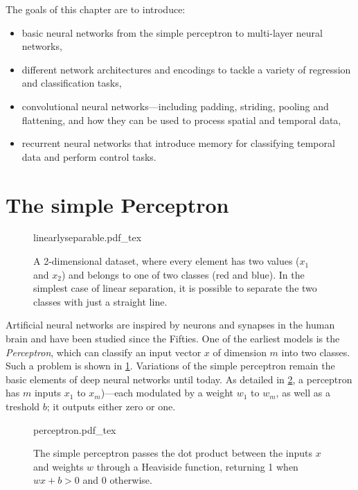 The goals of this chapter are to introduce:

\begin{itemize}
    \item basic neural networks from the simple perceptron to multi-layer neural networks,
    \item different network architectures and encodings to tackle a variety of regression and classification tasks,
    \item convolutional neural networks---including padding, striding, pooling and flattening, and how they can be used to process spatial and temporal data,
    \item recurrent neural networks that introduce memory for classifying temporal data and perform control tasks.
\end{itemize}


\section{The simple Perceptron}

\begin{figure}[!b]
    \centering
    \def\svgwidth{0.6\textwidth}
    {linearlyseparable.pdf_tex}
    \caption{A 2-dimensional dataset, where every element has two values ($x_1$ and $x_2$) and belongs to one of two classes (red and blue). In the simplest case of linear separation, it is possible to separate the two classes with just a straight line.\label{fig:linearsep}}
\end{figure}

Artificial neural networks are inspired by neurons and synapses in the human brain and have been studied since the Fifties. One of the earliest models is the \textsl{Perceptron}, which can classify an input vector $x$ of dimension $m$ into two classes. Such a problem is shown in \cref{fig:linearsep}. Variations of the simple perceptron remain the basic elements of deep neural networks until today.
%
As detailed in \cref{fig:perceptron}, a perceptron has $m$ inputs $x_1$ to $x_m$)---each modulated by a weight $w_1$ to $w_m$, as well as a treshold $b$; it outputs either zero or one.

\begin{figure}
    \centering
    \def\svgwidth{0.66\textwidth}
    {perceptron.pdf_tex}
    \caption{The simple perceptron passes the dot product between the inputs $x$ and weights $w$ through a Heaviside function, returning 1 when $wx+b>0$ and 0 otherwise.}\label{fig:perceptron}
\end{figure}

